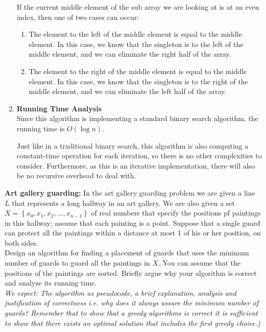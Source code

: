 \documentclass{report}
\begin{document}
\begin{enumerate}
    If the current middle element of the sub array we are looking at is at an even index, then one of two cases can occur:
    \begin{enumerate}
      \item The element to the left of the middle element is equal to the middle element. In this case, we know that the singleton is to the left of the middle element, and we can eliminate the right half of the array.
        \item The element to the right of the middle element is equal to the middle element. In this case, we know that the singleton is to the right of the middle element, and we can eliminate the left half of the array. \\
    \end{enumerate}


    \item \textbf{Running Time Analysis} \\

      Since this algorithm is implementing a standard binary search algorithm, the running time is $O(\log n)$. 

      \begin{note}
              Just like in a traditional binary search, this algorithm is also computing a constant-time operation for each iteration, so there is no other complexities to consider. Furthermore, as this is an iterative implementation, there will also be no recursive overhead to deal with. \\
      \end{note}

    \end{enumerate}


\newpage
    \qs {} {

\textbf{Art gallery guarding:} In the art gallery guarding problem we are given a line $L$ that represents a long hallway in an art gallery. We are also given a set $X=\left\{x_0, x_1, x_2, \ldots, x_{n-1}\right\}$ of real numbers that specify the positions pf paintings in this hallway; assume that each painting is a point. Suppose that a single guard can protect all the paintings within a distance at most 1 of his or her position, on both sides. \\

Design an algorithm for finding a placement of guards that uses the minimum number of guards to guard all the paintings in $X$. You can assume that the positions of the paintings are sorted. Briefly argue why your algorithm is correct and analyze its running time. \\

\textit{We expect: The algorithm as pseudocode, a brief explanation, analysis and justification of correctness i.e. why does it always assure the minimum number of guards? Remember that to show that a greedy algorithms is correct it is sufficient to show that there exists an optimal solution that includes the first greedy choice.)}

    }
\end{document}
